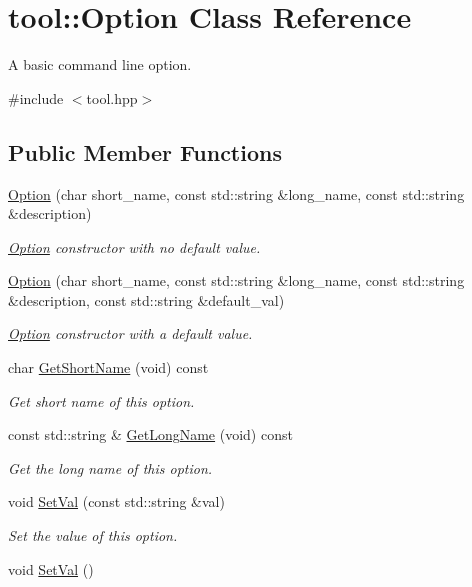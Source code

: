 \hypertarget{classtool_1_1Option}{}\section{tool\+:\+:Option Class Reference}
\label{classtool_1_1Option}


A basic command line option.  




{\ttfamily \#include $<$tool.\+hpp$>$}

\subsection*{Public Member Functions}
\begin{DoxyCompactItemize}
\item 
\hyperlink{classtool_1_1Option_ac9f2b30a192af0e158832b0bdef9aa93}{Option} (char short\+\_\+name, const std\+::string \&long\+\_\+name, const std\+::string \&description)
\begin{DoxyCompactList}\small\item\em \hyperlink{classtool_1_1Option}{Option} constructor with no default value. \end{DoxyCompactList}\item 
\hyperlink{classtool_1_1Option_aa5467959f13a00f8a560e735b4cfde72}{Option} (char short\+\_\+name, const std\+::string \&long\+\_\+name, const std\+::string \&description, const std\+::string \&default\+\_\+val)
\begin{DoxyCompactList}\small\item\em \hyperlink{classtool_1_1Option}{Option} constructor with a default value. \end{DoxyCompactList}\item 
char \hyperlink{classtool_1_1Option_a2a50ad5b1599988a26375e0a1c26258c}{Get\+Short\+Name} (void) const 
\begin{DoxyCompactList}\small\item\em Get short name of this option. \end{DoxyCompactList}\item 
const std\+::string \& \hyperlink{classtool_1_1Option_a79fef07bc337c275e41573572b615d29}{Get\+Long\+Name} (void) const 
\begin{DoxyCompactList}\small\item\em Get the long name of this option. \end{DoxyCompactList}\item 
void \hyperlink{classtool_1_1Option_a55095d2ae73bf936c2cb944e440b84b1}{Set\+Val} (const std\+::string \&val)
\begin{DoxyCompactList}\small\item\em Set the value of this option. \end{DoxyCompactList}\item 
void \hyperlink{classtool_1_1Option_a4fec21690e82f26e9d875dc1267bc3c3}{Set\+Val} ()\hypertarget{classtool_1_1Option_a4fec21690e82f26e9d875dc1267bc3c3}{}\label{classtool_1_1Option_a4fec21690e82f26e9d875dc1267bc3c3}


\end{DoxyCompactItemize}
